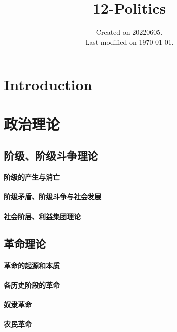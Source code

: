 \documentclass[UTF8]{../RepresentationUniverse}
\begin{document}
\title{12-Politics}
\date{Created on 20220605.\\   Last modified on \today.}
\maketitle
\tableofcontents


\chapter{Introduction}



\chapter{政治理论}


\section{阶级、阶级斗争理论}
    \subsubsection{阶级的产生与消亡}
    \subsubsection{阶级矛盾、阶级斗争与社会发展}
    \subsubsection{社会阶层、利益集团理论}

\section{革命理论}
    \subsubsection{革命的起源和本质}
    \subsubsection{各历史阶段的革命}
    \subsubsection{奴隶革命}
    \subsubsection{农民革命}
\end{document}
